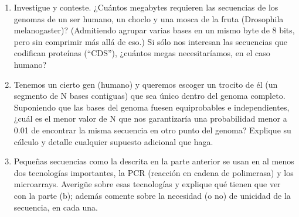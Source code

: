 \begin{enumerate}
\item Investigue y conteste. ¿Cuántos megabytes requieren las secuencias de los genomas de un ser
humano, un choclo y una mosca de la fruta (Drosophila melanogaster)? (Admitiendo agrupar varias
bases en un mismo byte de 8 bits, pero sin comprimir más allá de eso.) Si sólo nos interesan las
secuencias que codifican proteínas (“CDS”), ¿cuántos megas necesitaríamos, en el caso humano?


\item Tenemos un cierto gen (humano) y queremos escoger un trocito de él (un segmento de N bases
contiguas) que sea único dentro del genoma completo. Suponiendo que las bases del genoma fuesen
equiprobables e independientes, ¿cuál es el menor valor de N que nos garantizaría una probabilidad
menor a 0.01 de encontrar la misma secuencia en otro punto del genoma? Explique su cálculo y detalle
cualquier supuesto adicional que haga.


\item Pequeñas secuencias como la descrita en la parte anterior se usan en al menos dos tecnologías
importantes, la PCR (reacción en cadena de polimerasa) y los microarrays. Averigüe sobre esas
tecnologías y explique qué tienen que ver con la parte (b); además comente sobre la necesidad (o no) de
unicidad de la secuencia, en cada una.


\end{enumerate}

